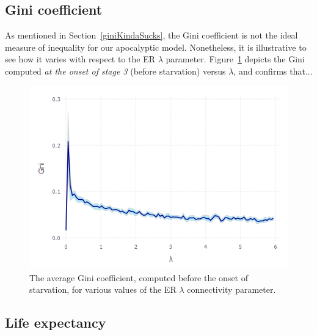 
\subsection{Gini coefficient}

As mentioned in Section~\ref{giniKindaSucks}, the Gini coefficient is not the
ideal measure of inequality for our apocalyptic model. Nonetheless, it is
illustrative to see how it varies with respect to the ER $\lambda$ parameter.
Figure~\ref{fig:giniVsLambda} depicts the Gini computed \textit{at the onset
of stage 3} (before starvation) versus $\lambda$, and confirms that...

\begin{figure}[hb]
\centering
\includegraphics[width=\columnwidth]{figures/giniVsLambda.png}
\caption{The average Gini coefficient, computed before the onset of starvation,
for various values of the ER $\lambda$ connectivity parameter.}
\label{fig:giniVsLambda}
\end{figure}


\subsection{Life expectancy}





